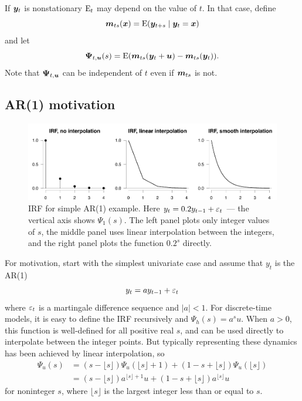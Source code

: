 \documentclass[AER,reviewmode]{tex/AEA}
\begin{document}
If $\bm{y}_t$ is nonstationary $\operatorname{E}_t$ may depend on the value of $t$. In that
case, define
\begin{equation*}
  \bm{m}_{ts}(\bm{x})
  = \operatorname{E}(\bm{y}_{t+s} \mid \bm{y}_t = \bm{x})
\end{equation*}
and let
\begin{equation*}
  \bm{\Psi}_{t,\bm{u}}(s) = \operatorname{E}(\bm{m}_{ts}(\bm{y}_t + \bm{u}) - \bm{m}_{ts}(\bm{y}_t)).
\end{equation*}
Note that $\bm{\Psi}_{t,\bm{u}}$ can be independent of $t$ even if $\bm{m}_{ts}$ is
not.

\subsection{AR(1) motivation}
\label{S2.1}

\begin{figure}[t]
  \centering
  \includegraphics[width=5.5in]{graphs/motivation.pdf}
  \caption{IRF for simple AR(1) example. Here $y_t = 0.2 y_{t-1} +
    \varepsilon_t$ --- the vertical axis shows $\Psi_1(s)$. The left panel
    plots only integer values of $s$, the middle panel uses linear
    interpolation between the integers, and the right panel plots the
    function $0.2^s$ directly.}
  \label{fig:1}
\end{figure}

\noindent%
For motivation, start with the simplest univariate case and assume
that $y_t$ is the AR(1)
\begin{equation}
  \label{eq:1}
  y_t = a y_{t-1} + \varepsilon_t
\end{equation}
where $\varepsilon_t$ is a martingale difference sequence and
$\lvert a \rvert < 1$.  For discrete-time models, it is easy to define
the IRF recursively and $\Psi_h(s) = a^s u$. When $a > 0$, this
function is well-defined for all positive real $s$, and can be used
directly to interpolate between the integer points. But typically
representing these dynamics has been achieved by linear interpolation,
so
\begin{align}
  \label{eq:2}
  \Psi_u(s)
  &= (s - \lfloor s\rfloor) \Psi_u(\lfloor s\rfloor+1)
    + (1 - s + \lfloor s\rfloor) \Psi_u(\lfloor s\rfloor) \\
  \label{eq:3}
  &= (s - \lfloor s\rfloor) a^{\lfloor s \rfloor + 1} u
    + (1 - s + \lfloor s\rfloor) a^{\lfloor s \rfloor} u
\end{align}
for noninteger $s$, where $\lfloor s\rfloor$ is the largest integer
less than or equal to $s$.
\end{document}
